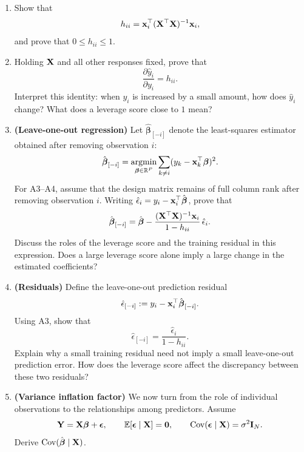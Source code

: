 \begin{enumerate}[label=\textcolor{AccentInk}{\sffamily\bfseries A\arabic*.},
                  ref=A\arabic*,leftmargin=2.65em,labelsep=0.65em,itemsep=1em]
\item Show that
\[
    h_{ii}=\mathbf{x}_i^\top(\mathbf{X}^\top\mathbf{X})^{-1}\mathbf{x}_i,
\]
and prove that $0\le h_{ii}\le 1$.

\item Holding $\mathbf{X}$ and all other responses fixed, prove that
\[
    \frac{\partial\hat y_i}{\partial y_i}=h_{ii}.
\]
Interpret this identity: when $y_i$ is increased by a small amount, how does
$\hat y_i$ change? What does a leverage score close to $1$ mean?

\item \textbf{(Leave-one-out regression)}
Let $\hat{\boldsymbol\beta}_{[-i]}$ denote the least-squares estimator obtained
after removing observation $i$:
\[
    \hat{\boldsymbol\beta}_{[-i]}
    =\operatorname*{argmin}_{\boldsymbol\beta\in\mathbb R^P}
    \sum_{k\ne i}(y_k-\mathbf{x}_k^\top\boldsymbol\beta)^2.
\]
For A3--A4, assume that the design matrix remains of full column rank after
removing observation $i$. Writing
$\hat\epsilon_i=y_i-\mathbf{x}_i^\top\hat{\boldsymbol\beta}$, prove that
\[
    \hat{\boldsymbol\beta}_{[-i]}
    =\hat{\boldsymbol\beta}
    -\frac{(\mathbf{X}^\top\mathbf{X})^{-1}\mathbf{x}_i}{1-h_{ii}}\,\hat\epsilon_i.
\]
Discuss the roles of the leverage score and the training residual in this
expression. Does a large leverage score alone imply a large change in the
estimated coefficients?

\item \textbf{(Residuals)}
Define the leave-one-out prediction residual
\[
    \hat\epsilon_{[-i]}:=y_i-\mathbf{x}_i^\top\hat{\boldsymbol\beta}_{[-i]}.
\]
Using A3, show that
\[
    \hat\epsilon_{[-i]}=\frac{\hat\epsilon_i}{1-h_{ii}}.
\]
Explain why a small training residual need not imply a small leave-one-out
prediction error. How does the leverage score affect the discrepancy between
these two residuals?

\newpage
\item \textbf{(Variance inflation factor)}
We now turn from the role of individual observations to the relationships among
predictors. Assume
\[
    \mathbf{Y}=\mathbf{X}\boldsymbol\beta+\boldsymbol\epsilon,
    \qquad
    \mathbb E[\boldsymbol\epsilon\mid\mathbf{X}]=\mathbf0,
    \qquad
    \operatorname{Cov}(\boldsymbol\epsilon\mid\mathbf{X})=\sigma^2\mathbf{I}_N.
\]
Derive $\operatorname{Cov}(\hat{\boldsymbol\beta}\mid\mathbf{X})$.


\end{enumerate}

